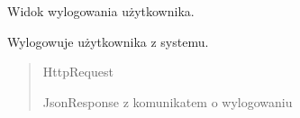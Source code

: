 \documentclass[letterpaper,10pt,polish]{sphinxmanual}
\begin{document}
\begin{fulllineitems}
\label{\detokenize{mainApp:mainApp.views.user_logout}}
\pysigstartsignatures
{}
\pysigstopsignatures
\sphinxAtStartPar
Widok wylogowania użytkownika.

\sphinxAtStartPar
Wylogowuje użytkownika z systemu.
\begin{quote}\begin{description}
\sphinxAtStartPar
{} \textendash{} HttpRequest

\sphinxAtStartPar
JsonResponse z komunikatem o wylogowaniu

\end{description}\end{quote}

\end{fulllineitems}
\end{document}
